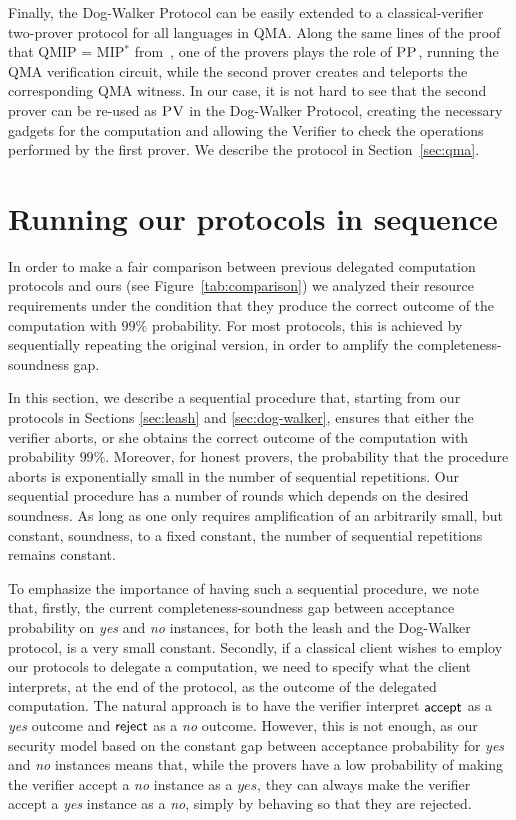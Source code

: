 \documentclass[11pt]{article}
\newcommand{\pv}{\textsc{PV}}
\newcommand{\pp}{\textsc{PP}}
\begin{document}
Finally, the Dog-Walker Protocol can be easily extended to a classical-verifier  two-prover protocol for all languages in QMA. 
Along the same lines of the proof that QMIP = MIP$^*$ from~\cite{reichardt2012classical}, one of the provers plays the role of $\pp$, running the  QMA verification circuit, while the second prover creates and teleports the corresponding QMA witness. In our case, it is not hard to see that the second prover can be  re-used as $\pv$ in the Dog-Walker Protocol, creating the necessary gadgets for the computation and allowing the Verifier to check the operations performed by the first prover.  We describe the protocol in Section~\ref{sec:qma}.




\section{Running our protocols in sequence}
\label{sec:sequential}

In order to make a fair comparison between previous delegated computation protocols and ours (see Figure~\ref{tab:comparison}) we analyzed their resource requirements under the condition that they produce the correct outcome of the computation with $99\%$ probability. For most protocols, this is achieved by sequentially repeating the original version, in order to amplify the completeness-soundness gap. 

In this section, we describe a sequential procedure that, starting from our protocols in Sections \ref{sec:leash} and \ref{sec:dog-walker}, ensures that either the verifier aborts, or she obtains the correct outcome of the computation with probability $99\%$. Moreover, for honest provers, the probability that the procedure aborts is exponentially small in the number of sequential repetitions. Our sequential procedure has a number of rounds which depends on the desired soundness. As long as one only requires amplification of an arbitrarily small, but constant, soundness, to a fixed constant, the number of sequential repetitions remains constant.

To emphasize the importance of having such a sequential procedure, we note that, firstly, the current completeness-soundness gap between acceptance probability on \textit{yes} and \textit{no} instances, for both the leash and the Dog-Walker protocol, is a very small constant. Secondly, if a classical client wishes to employ our protocols to delegate a computation, we need to specify what the client interprets, at the end of the protocol, as the outcome of the delegated computation. The natural approach is to have the verifier interpret $\sf accept$ as a \textit{yes} outcome and $\sf reject$ as a \textit{no} outcome. However, this is not enough, as our security model based on the constant gap between acceptance probability for \textit{yes} and \textit{no} instances means that, while the provers have a low probability of making the verifier accept a \textit{no} instance as a $\textit{yes}$, they can always make the verifier accept a \textit{yes} instance as a \textit{no}, simply by behaving so that they are rejected.
\end{document}
